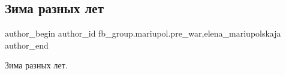  
 
 
 
 

\subsection{Зима разных лет}
\label{sec:17_02_2023.fb.fb_group.mariupol.pre_war.4.zima_raznikh_let}
 
\ifcmt
 author_begin
   author_id fb_group.mariupol.pre_war,elena_mariupolskaja
 author_end
\fi

Зима разных лет.
